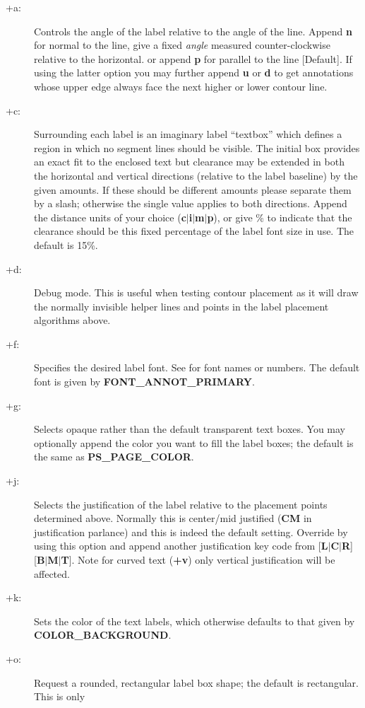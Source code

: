 \begin{description}
\item [+a:]  Controls the angle of the label relative to the angle of the line.  Append {\bf n}
for normal to the line, give a fixed {\it angle} measured counter-clockwise relative to the
horizontal. or append {\bf p} for parallel to the line [Default].  If using 
the latter option you may further append {\bf u} or {\bf d} to get annotations whose upper edge
always face the next higher or lower contour line.
\item [+c:] Surrounding each label is an imaginary label ``textbox'' which defines a region in
which no segment lines should be visible.  The initial box provides an exact fit to the enclosed
text but clearance may be extended in both the horizontal and vertical directions (relative to the label
baseline) by the given amounts.  If these should be different amounts please separate them by
a slash; otherwise the single value applies to both directions.  Append the distance units of
your choice ({\bf c$|$i$|$m$|$p}), or give \% to indicate that the clearance should be this
fixed percentage of the label font size in use.  The default is 15\%.
\item [+d:] Debug mode.  This is useful when testing contour placement as it will draw the normally
invisible helper lines and points in the label placement algorithms above.
\item [+f:] Specifies the desired label font.  See  for font names or numbers.  The
default font is given by \textbf{FONT\_ANNOT\_PRIMARY}.
\item [+g:] Selects opaque rather than the default transparent text boxes.  You may optionally append
the color you want to fill the label boxes; the default is the same as \textbf{PS\_PAGE\_COLOR}.
\item [+j:] Selects the justification of the label relative to the placement points determined
above.  Normally this is center/mid justified ({\bf CM} in  justification parlance) and
this is indeed the default setting.  Override by using this option and append another justification
key code from [{\bf L$|$C$|$R}][{\bf B$|$M$|$T}].  Note for curved text ({\bf +v}) only vertical
justification will be affected.
\item [+k:] Sets the color of the text labels, which otherwise defaults to that given by \textbf{COLOR\_BACKGROUND}.
\item [+o:] Request a rounded, rectangular label box shape; the default is rectangular.  This is only

\end{description}
